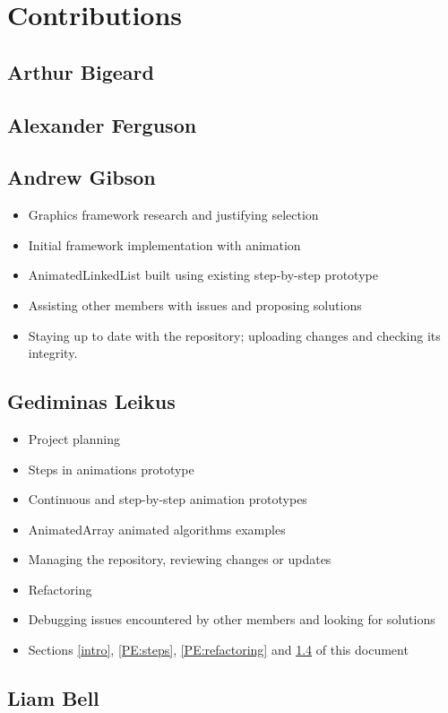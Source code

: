 \documentclass{l3proj}
\begin{document}
\section{Contributions}
\subsection{Arthur Bigeard}
\subsection{Alexander Ferguson}
\subsection{Andrew Gibson}
\begin{itemize}
	\item Graphics framework research and justifying selection
	\item Initial framework implementation with animation
	\item AnimatedLinkedList built using existing step-by-step prototype
	\item Assisting other members with issues and proposing solutions
	\item Staying up to date with the repository; uploading changes
and checking its integrity.
\end{itemize}
\subsection{Gediminas Leikus}
\label{Gediminas:Con}
\begin{itemize}
	\item Project planning
	\item Steps in animations prototype
	\item Continuous and step-by-step animation prototypes
	\item AnimatedArray animated algorithms examples
	\item Managing the repository, reviewing changes or updates
	\item Refactoring
	\item Debugging issues encountered by other members and looking for solutions
	\item Sections \ref{intro}, \ref{PE:steps}, \ref{PE:refactoring} and \ref{Gediminas:Con} of this document
\end{itemize}
\subsection{Liam Bell}



\end{document}
